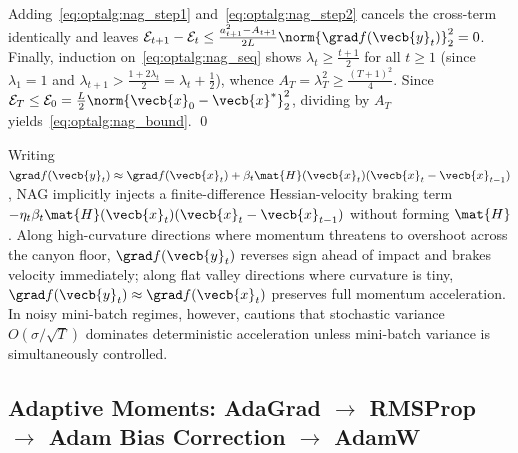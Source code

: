 \documentclass[../../../../master.tex]{subfiles}
\begin{document}
\begin{coremath}
\begin{equation}
\end{equation}
Adding~\eqref{eq:optalg:nag_step1} and~\eqref{eq:optalg:nag_step2} cancels the cross-term identically and leaves $\mathcal{E}_{t+1} - \mathcal{E}_t \le \frac{a_{t+1}^2 - A_{t+1}}{2L}\norm{\grad f(\vecb{y}_t)}_2^2 = 0$. Finally, induction on~\eqref{eq:optalg:nag_seq} shows $\lambda_t \ge \frac{t+1}{2}$ for all $t \ge 1$ (since $\lambda_1 = 1$ and $\lambda_{t+1} > \frac{1 + 2\lambda_t}{2} = \lambda_t + \frac{1}{2}$), whence $A_T = \lambda_T^2 \ge \frac{(T+1)^2}{4}$. Since $\mathcal{E}_T \le \mathcal{E}_0 = \frac{L}{2}\norm{\vecb{x}_0 - \vecb{x}^*}_2^2$, dividing by $A_T$ yields~\eqref{eq:optalg:nag_bound}. \qed
\end{coremath}

\begin{intuition}
Writing $\grad f(\vecb{y}_t) \approx \grad f(\vecb{x}_t) + \beta_t \mat{H}(\vecb{x}_t)(\vecb{x}_t - \vecb{x}_{t-1})$, NAG implicitly injects a finite-difference Hessian-velocity braking term $-\eta_t \beta_t \mat{H}(\vecb{x}_t)(\vecb{x}_t - \vecb{x}_{t-1})$ without forming $\mat{H}$  . Along high-curvature directions where momentum threatens to overshoot across the canyon floor, $\grad f(\vecb{y}_t)$ reverses sign ahead of impact and brakes velocity immediately; along flat valley directions where curvature is tiny, $\grad f(\vecb{y}_t) \approx \grad f(\vecb{x}_t)$ preserves full momentum acceleration. In noisy mini-batch regimes, however,  cautions that stochastic variance $O(\sigma/\sqrt{T})$ dominates deterministic acceleration unless mini-batch variance is simultaneously controlled.
\end{intuition}

\subsection{Adaptive Moments: AdaGrad \texorpdfstring{$\to$}{->} RMSProp \texorpdfstring{$\to$}{->} Adam Bias Correction \texorpdfstring{$\to$}{->} AdamW}
\label{subsec:optalg:adaptive}
\end{document}
